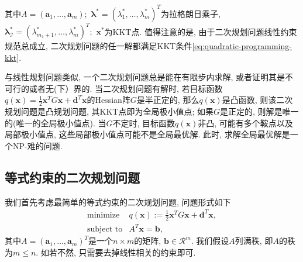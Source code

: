 \documentclass{SBCbookchapter}
\newcommand{\V}[1]{{\bm{#1}}}
\newcommand{\R}{\mathcal{R}}
\numberwithin{equation}{section}
\begin{document}
其中$A = (\V{a}_1, \ldots, \V{a}_m);$ $\V{\lambda}^* = (\lambda_1^*, \ldots, \lambda_m^*)^T$为拉格朗日乘子, $\V{\lambda}^*_{\mathcal{I}} = (\lambda_{m_1+1}^*, \ldots, \lambda_m^*)^T;$ $\V{x}^*$为KKT点. 值得注意的是, 由于二次规划问题线性约束规范总成立, 二次规划问题的任一解都满足KKT条件\eqref{eq:quadratic-programming-kkt}.

与线性规划问题类似, 一个二次规划问题总是能在有限步内求解, 或者证明其是不可行的或者无(下）界的. 当二次规划问题有解时, 若目标函数$q(\V{x}) = \frac{1}{2} \V{x}^T G \V{x} + \V{d}^T \V{x}$的Hessian阵$G$是半正定的, 那么$q(\V{x})$是凸函数, 则该二次规划问题是凸规划问题, 其KKT点即为全局极小值点; 如果$G$是正定的, 则解是唯一的(唯一的全局极小值点). 当$G$不定时, 目标函数$q(\V{x})$非凸, 可能有多个鞍点以及局部极小值点, 这些局部极小值点可能不是全局最优解. 此时, 求解全局最优解是一个NP-难的问题\cite{Murty_1987}.

\subsection{等式约束的二次规划问题}
\label{subsec:7.2.1}

我们首先考虑最简单的等式约束的二次规划问题, 问题形式如下
\begin{equation}
\label{eq:quadratic-programming-eq-constrained}
\begin{array}{cl}
\text{minimize} & q(\V{x}) := \frac{1}{2} \V{x}^T G \V{x} + \V{d}^T \V{x}, \\
\text{subject to} & A^T \V{x} = \V{b},
\end{array}
\end{equation}
其中$A = (\V{a}_1, \ldots, \V{a}_m)^T$是一个$n \times m$的矩阵, $\V{b} \in \R^m.$ 我们假设$A$列满秩, 即$A$的秩为$m \leqslant n.$ 如若不然, 只需要去掉线性相关的约束即可.
\end{document}
